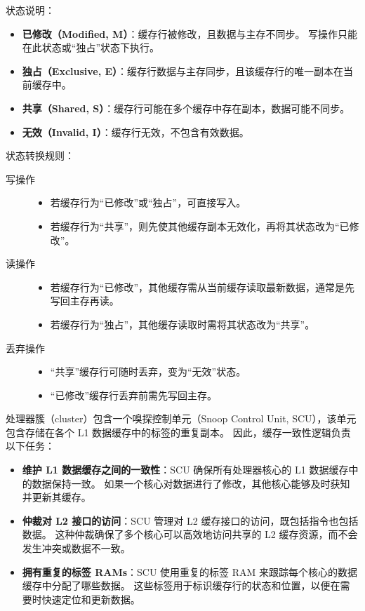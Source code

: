 
状态说明：

\begin{itemize}
\item
  \textbf{已修改（Modified, M）}：缓存行被修改，且数据与主存不同步。
  写操作只能在此状态或“独占”状态下执行。
\item
  \textbf{独占（Exclusive, E）}：缓存行数据与主存同步，且该缓存行的唯一副本在当前缓存中。
\item
  \textbf{共享（Shared, S）}：缓存行可能在多个缓存中存在副本，数据可能不同步。
\item
  \textbf{无效（Invalid, I）}：缓存行无效，不包含有效数据。
\end{itemize}

状态转换规则：

\begin{description}
\item [{写操作}] \hfill
  \begin{itemize}
  \item
    若缓存行为“已修改”或“独占”，可直接写入。
  \item
    若缓存行为“共享”，则先使其他缓存副本无效化，再将其状态改为“已修改”。
  \end{itemize}
\item
  [{读操作}] \hfill
  \begin{itemize}
  \item
    若缓存行为“已修改”，其他缓存需从当前缓存读取最新数据，通常是先写回主存再读。
  \item
    若缓存行为“独占”，其他缓存读取时需将其状态改为“共享”。
  \end{itemize}
\item [{丢弃操作}] \hfill
  \begin{itemize}
  \item
    “共享”缓存行可随时丢弃，变为“无效”状态。
  \item
    “已修改”缓存行丢弃前需先写回主存。
  \end{itemize}
\end{description}

处理器簇（cluster）包含一个嗅探控制单元（Snoop Control Unit,
SCU），该单元包含存储在各个 L1 数据缓存中的标签的重复副本。
因此，缓存一致性逻辑负责以下任务：

\begin{itemize}
\item
  \textbf{维护 L1 数据缓存之间的一致性}：SCU 确保所有处理器核心的 L1 数据缓存中的数据保持一致。
  如果一个核心对数据进行了修改，其他核心能够及时获知并更新其缓存。
\item
  \textbf{仲裁对 L2 接口的访问}：SCU 管理对 L2 缓存接口的访问，既包括指令也包括数据。
  这种仲裁确保了多个核心可以高效地访问共享的 L2 缓存资源，而不会发生冲突或数据不一致。
\item
  \textbf{拥有重复的标签 RAMs}：SCU 使用重复的标签 RAM 来跟踪每个核心的数据缓存中分配了哪些数据。
  这些标签用于标识缓存行的状态和位置，以便在需要时快速定位和更新数据。
\end{itemize}

